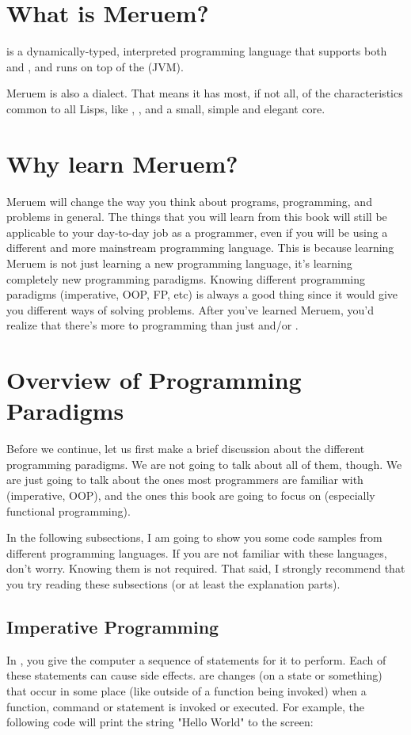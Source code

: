 \section{What is Meruem?}
 is a dynamically-typed, interpreted programming language that supports both  and , and runs on top of the  (JVM).

Meruem is also a  dialect. That means it has most, if not all, of the characteristics common to all Lisps, like , , and a small, simple and elegant core.

\section{Why learn Meruem?}
Meruem will change the way you think about programs, programming, and problems in general. The things that you will learn from this book will still be applicable to your day-to-day job as a programmer, even if you will be using a different and more mainstream programming language. This is because learning Meruem is not just learning a new programming language, it's learning completely new programming paradigms. Knowing different programming paradigms (imperative, OOP, FP, etc) is always a good thing since it would give you different ways of solving problems. After you've learned Meruem, you'd realize that there's more to programming than just  and/or .

\section{Overview of Programming Paradigms}
Before we continue, let us first make a brief discussion about the different programming paradigms. We are not going to talk about all of them, though. We are just going to talk about the ones most programmers are familiar with (imperative, OOP), and the ones this book are going to focus on (especially functional programming).

In the following subsections, I am going to show you some code samples from different programming languages. If you are not familiar with these languages, don't worry. Knowing them is not required. That said, I strongly recommend that you try reading these subsections (or at least the explanation parts).

\subsection{Imperative Programming}
In , you give the computer a sequence of statements for it to perform. Each of these statements can cause side effects.  are changes (on a state or something) that occur in some place (like outside of a function being invoked) when a function, command or statement is invoked or executed. For example, the following code will print the string "Hello World" to the screen:

